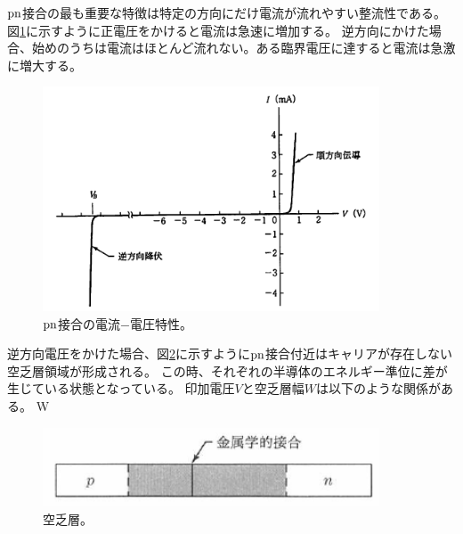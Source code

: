 $\rm{pn}$接合の最も重要な特徴は特定の方向にだけ電流が流れやすい整流性である。図\ref{pn_iv}に示すように正電圧をかけると電流は急速に増加する。
逆方向にかけた場合、始めのうちは電流はほとんど流れない。ある臨界電圧に達すると電流は急激に増大する。

\begin{figure}[bpt]\centering
\includegraphics[width=10cm]{./pn_iv.png}
\caption[$\rm{pn}$接合の電流$-$電圧特性]{$\rm{pn}$接合の電流$-$電圧特性\cite{2-1}。}
\label{pn_iv}
\end{figure}

逆方向電圧をかけた場合、図\ref{depletion_field}に示すように$\rm{pn}$接合付近はキャリアが存在しない空乏層領域が形成される。
この時、それぞれの半導体のエネルギー準位に差が生じている状態となっている。
印加電圧$V$と空乏層幅$W$は以下のような関係がある。
\bbb
W \propto {}
\eee

\begin{figure}[bpt]\centering
\includegraphics[width=10cm]{./depletion_field.png}
\caption[空乏層]{空乏層\cite{2-1}。}
\label{depletion_field}
\end{figure}

